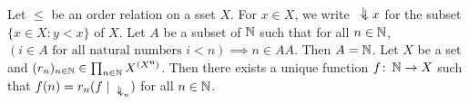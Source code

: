  Let $\leq$ be an order relation on a sset $X$. For $x \in X$, we write $\ddownarrow x$ for the subset $\{ x \in X \colon y < x \}$ of $X$.
 Let $A$ be a subset of $\operatorname{\mathbb{N}}$ such that for all $n \in \operatorname{\mathbb{N}}$, $(i \in A \text{ for all natural numbers } i < n) \implies n \in AA$. Then $A = \operatorname{\mathbb{N}}$.
 Let $X$ be a set and $(r_n)_{n \in \operatorname{\mathbb{N}}} \in \prod_{n \in \operatorname{\mathbb{N}}} X^{(X^{\mathbf{n}})}$. Then there exists a unique function $f \colon \operatorname{\mathbb{N}} \to X$ such that $f(n) = r_n (f \mid_{\ddownarrow_n})$ for all $n \in \operatorname{\mathbb{N}}$.
